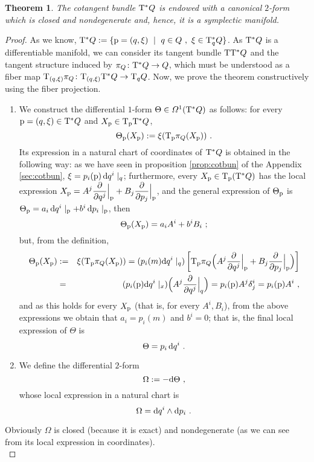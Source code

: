 \documentclass[12pt]{report}
\newtheorem{teor}{Theorem}[chapter]
\def\dst{\displaystyle}
\def\derpar#1#2{\frac{\partial{#1}}{\partial{#2}}}
\def\qed{\ifvmode\removelastskip\fi
{\unskip\nobreak\hfil\penalty50\hbox{}\nobreak\hfil
\hbox{\vrule height1.2ex width1.2ex}\parfillskip=0pt
\finalhyphendemerits=0 \par\smallskip}}
\def\d{{\rm d}}
\def\Tan{{\rm T}}
\begin{document}
\begin{teor}
The cotangent bundle $\Tan^*Q$ is endowed with a canonical $2$-form
which is closed and nondegenerate and, hence, it
is a {\sl symplectic manifold}.
\label{ficotvs}
\end{teor}
\begin{proof}
As we know,
$\Tan^*Q := \{ {\rm p}= (q,\xi) \ \mid \ q \in Q \ ,  \ \xi \in \Tan^*_qQ \}$.
As $\Tan^*Q$ is a differentiable manifold,
we can consider its tangent bundle $\Tan\Tan^*Q$
and the tangent structure induced by
$\pi_Q \colon \Tan^*Q \to Q$,
which must be understood as a fiber map
$\Tan_{(q,\xi)}\pi_Q \colon \Tan_{(q,\xi)}\Tan^*Q \to \Tan_q Q$.
Now, we prove the theorem constructively using the fiber projection.
\begin{enumerate}
\item
We construct the  differential $1$-form
$\Theta \in {\mit\Omega}^1(\Tan^*Q)$
as follows: for every ${\rm p}=(q,\xi) \in \Tan^*Q$ and
$X_{\rm p} \in \Tan_{\rm p}\Tan^*Q$,
$$
\Theta_{\rm p}(X_{\rm p}) := \xi(\Tan_{\rm p}\pi_Q(X_{\rm p})) \ .
$$
Its expression in a natural chart of coordinates of $\Tan^*Q$
is obtained in the following way:
as we have seen in proposition \ref{prop:cotbun} of the Appendix \ref{sec:cotbun},
$\xi = p_i({\rm p})\,\d q^i\mid_q$;
furthermore, every $X_{\rm p} \in \Tan_{\rm p}(\Tan^*Q)$ has the local expression
\(\dst X_{\rm p}= A^j\derpar{}{q^j}\Big\vert_{\rm p}+B_j\derpar{}{p_j}\Big\vert_{\rm p}\),
and the general expression of $\Theta_{\rm p}$ is
$\Theta_{\rm p}= a_i\,\d q^i\mid_{\rm p} + b^i\,\d p_i\mid_{\rm p}$, then
$$
\Theta_{\rm p}(X_{\rm p}) = a_iA^i + b^iB_i \ ;
$$
but, from the definition,
\begin{eqnarray*}
\Theta_{\rm p}(X_{\rm p}) &:=& \xi(\Tan_{\rm p}\pi_Q(X_{\rm p}))
=(p_i(m)\d q^i\mid_q)
\left[\Tan_{\rm p}\pi_Q \Big(A^j\derpar{}{q^j}\Big\vert_{\rm p}+
B_j\derpar{}{p_j}\Big\vert_{\rm p}\Big)\right]
\\ &=&
(p_i({\rm p})\d q^i\mid_x)\Big( A^j\derpar{}{q^j}\Big\vert_q\Big)
= p_i({\rm p})A^j\delta^i_j = p_i({\rm p})A^i \ ,
\end{eqnarray*}
and as this holds for every $X_{\rm p}$ (that is, for every $A^i,B_i$),
from the above expressions we obtain that
$a_i=p_i(m)$ and $b^i=0$; that is, the final local expression of $\Theta$ is
$$
\Theta = p_i\,\d q^i \ .
$$
\item
We define the differential $2$-form
$$
\Omega := -\d\Theta \ ,
$$
whose local expression in a natural chart is
$$
\Omega = \d q^i \wedge \d p_i \ .
$$
\end{enumerate}
Obviously $\Omega$ is closed (because it is exact)
and  nondegenerate (as we can see from its local expression in coordinates).
\\ \qed  \end{proof}
\end{document}
